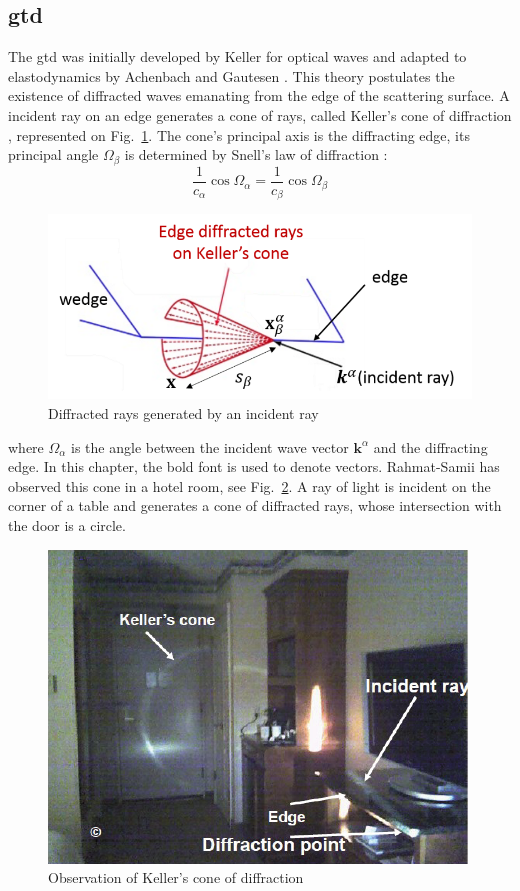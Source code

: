 \subsection{\acrfull{gtd}}
\label{C1:GTD}
The \acrfull{gtd} was initially developed by Keller \cite{GTD} for optical waves and adapted to elastodynamics by Achenbach and Gautesen \cite{AchenbachGautesen, Achenbach}. This theory postulates the existence of diffracted waves emanating from the edge of the scattering surface. A incident ray on an edge generates a cone of rays, called Keller's cone of diffraction \cite{GTD}, represented on Fig.~\ref{KellerCone}. The cone's principal axis is the diffracting edge, its principal angle $\Omega_{\beta}$ is determined by Snell's law of diffraction :
\begin{equation}
    \frac{1}{c_{\alpha}}\cos\Omega_{\alpha} = \frac{1}{c_{\beta}} \cos\Omega_{\beta}
\end{equation}

\begin{figure}
    \centering
    \includegraphics[width=\textwidth]{images/chapter1/KellerCone.png}
    \caption{Diffracted rays generated by an incident ray}
    \label{KellerCone}
\end{figure}
where $\Omega_{\alpha}$ is the angle between the incident wave vector $\mathbf{k}^{\alpha}$ and the diffracting edge. In this chapter, the bold font is used to denote vectors. Rahmat-Samii \cite{ConePhoto} has observed this cone in a hotel room, see Fig.~\ref{PhotoCone}. A ray of light is incident on the corner of a table and generates a cone of diffracted rays, whose intersection with the door is a circle.

\begin{figure}
    \centering
    \includegraphics{images/chapter1/HotelCone.png}
    \caption{Observation of Keller's cone of diffraction}
    \label{PhotoCone}
\end{figure}

